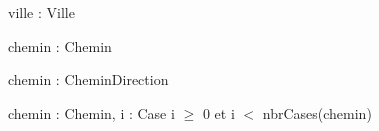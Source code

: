 \begin{algorithme}
        {}{}

    \vspace{1.5em}

        {ville : Ville}{}

    \vspace{1.5em}

        {chemin : Chemin}{\naturel}

    \vspace{1.5em}

        {chemin : Chemin}{Direction}

    \vspace{1.5em}

        {chemin : Chemin, i : \naturel}{Case}
        {i $\geq$ 0 et i $<$ nbrCases(chemin)}

\end{algorithme}